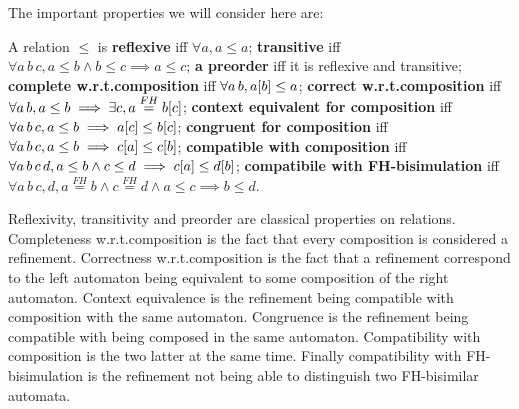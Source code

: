 \documentclass{article}
\begin{document}

The important properties we will consider here are:
\begin{defi} A relation \(\leq\) is
 \textbf{reflexive} iff \(\forall a, a \leq a\);
 \textbf{transitive} iff \(\forall a\, b\, c, a \leq b \wedge b \leq c \implies a \leq c\);
 \textbf{a preorder} iff it is reflexive and transitive;
 \textbf{complete w.r.t.\@ composition} iff \(\forall a\, b, a{\left[b\right]} \leq a\);
 \textbf{correct w.r.t.\@ composition} iff \(\forall a\, b, a \leq b \implies \exists c, a \overset{FH}= b{\left[c\right]}\);
 \textbf{context equivalent for composition} iff \(\forall a\, b\, c, a \leq b \implies a{\left[c\right]} \leq b{\left[c\right]}\);
 \textbf{congruent for composition} iff \(\forall a\, b\, c, a \leq b \implies c{\left[a\right]} \leq c{\left[b\right]}\);
 \textbf{compatible with composition} iff \(\forall a\, b\, c\, d, a \leq b \wedge c \leq d \implies c{\left[a\right]} \leq d{\left[b\right]}\);
 \textbf{compatibile with FH-bisimulation} iff \(\forall a\, b\, c, d, a \overset{FH}= b \wedge c \overset{FH}= d \wedge a \leq c \implies b \leq d\).
\end{defi}
Reflexivity, transitivity and preorder are classical properties on relations.
Completeness w.r.t.\@ composition is the fact that every composition is considered a refinement.
Correctness w.r.t.\@ composition is the fact that a refinement correspond to the left automaton being equivalent to some composition of the right automaton.
Context equivalence is the refinement being compatible with composition with the same automaton.
Congruence is the refinement being compatible with being composed in the same automaton.
Compatibility with composition is the two latter at the same time.
Finally compatibility with FH-bisimulation is the refinement not being able to distinguish two FH-bisimilar automata.
\end{document}

